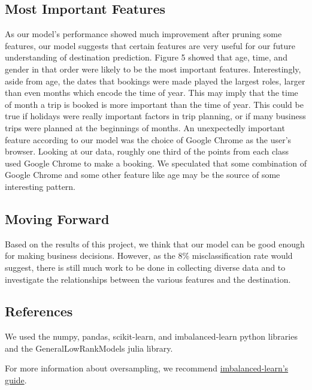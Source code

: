 \documentclass[a4paper, 11pt]{article}
\begin{document}
\subsection*{Most Important Features}
\par
As our model’s performance showed much improvement after pruning some features, our model suggests that certain features are very useful for our future understanding of destination prediction. Figure 5 showed that age, time, and gender in that order were likely to be the most important features. Interestingly, aside from age, the dates that bookings were made played the largest roles, larger than even months which encode the time of year. This may imply that the time of month a trip is booked is more important than the time of year. This could be true if holidays were really important factors in trip planning, or if many business trips were planned at the beginnings of months. An unexpectedly important feature according to our model was the choice of Google Chrome as the user’s browser. Looking at our data, roughly one third of the points from each class used Google Chrome to make a booking. We speculated that some combination of Google Chrome and some other feature like age may be the source of some interesting pattern.

\subsection*{Moving Forward}
Based on the results of this project, we think that our model can be good enough for making business decisions. However, as the 8\% misclassification rate would suggest, there is still much work to be done in collecting diverse data and to investigate the relationships between the various features and the destination.

\subsection*{References}
We used the numpy, pandas, scikit-learn, and imbalanced-learn python libraries and the GeneralLowRankModels julia library.

For more information about oversampling, we recommend \href{http://contrib.scikit-learn.org/imbalanced-learn/stable/over_sampling.html}{imbalanced-learn's guide}.
\end{document}
